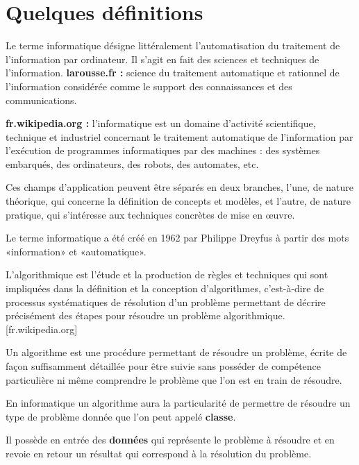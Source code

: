 \section{Quelques définitions}

\begin{defi}[Informatique]
Le terme informatique désigne littéralement l'automatisation du traitement de l'information par ordinateur. Il s'agit en fait des sciences et techniques de l'information. 
\textbf{larousse.fr :} science du traitement automatique et rationnel de l'information considérée comme le support des connaissances et des communications.

\textbf{fr.wikipedia.org :} l'informatique est un domaine d'activité scientifique, technique et industriel concernant le traitement automatique de l'information par l'exécution de programmes informatiques par des machines : des systèmes embarqués, des ordinateurs, des robots, des automates, etc.

Ces champs d'application peuvent être séparés en deux branches, l'une, de nature théorique, qui concerne la définition de concepts et modèles, et l'autre, de nature pratique, qui s'intéresse aux techniques concrètes de mise en œuvre.

Le terme informatique a été créé en 1962 par Philippe Dreyfus à partir des mots «information» et «automatique».
\end{defi}



\begin{defi}[Algorithmique]
L'algorithmique est l'étude et la production de règles et techniques qui sont impliquées dans la définition et la conception d'algorithmes, c'est-à-dire de processus systématiques de résolution d'un problème permettant de décrire précisément des étapes pour résoudre un problème algorithmique. [fr.wikipedia.org]

Un algorithme est une procédure permettant de résoudre un problème, écrite de façon suffisamment détaillée pour être suivie sans posséder de compétence particulière ni même comprendre le problème que l'on est en train de résoudre.

En informatique un algorithme aura la particularité de permettre de résoudre un type de problème donnée que l'on peut appelé \textbf{classe}.

Il possède en entrée des \textbf{données} qui représente le problème à résoudre et en revoie en retour un résultat qui correspond à la résolution du problème.


\end{defi}


